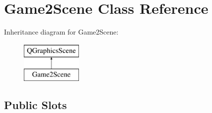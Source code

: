 \hypertarget{classGame2Scene}{\section{Game2\-Scene Class Reference}
\label{classGame2Scene}
}
Inheritance diagram for Game2\-Scene\-:\begin{figure}[H]
\begin{center}
\leavevmode
\includegraphics[height=2.000000cm]{classGame2Scene}
\end{center}
\end{figure}
\subsection*{Public Slots}

